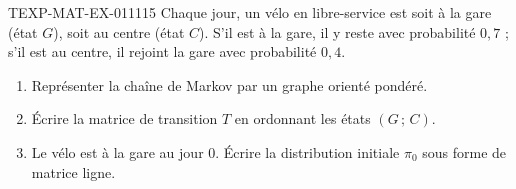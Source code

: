 \begin{exercice}{TEXP-MAT-EX-011}{1}{15}
Chaque jour, un vélo en libre-service est soit à la gare (état $G$), soit au
centre (état $C$). S'il est à la gare, il y reste avec probabilité $0{,}7$ ;
s'il est au centre, il rejoint la gare avec probabilité $0{,}4$.
\begin{enumerate}
  \item Représenter la chaîne de Markov par un graphe orienté pondéré.
  \item Écrire la matrice de transition $T$ en ordonnant les états $(G\,;\,C)$.
  \item Le vélo est à la gare au jour $0$. Écrire la distribution initiale
        $\pi_0$ sous forme de matrice ligne.
\end{enumerate}
\end{exercice}
